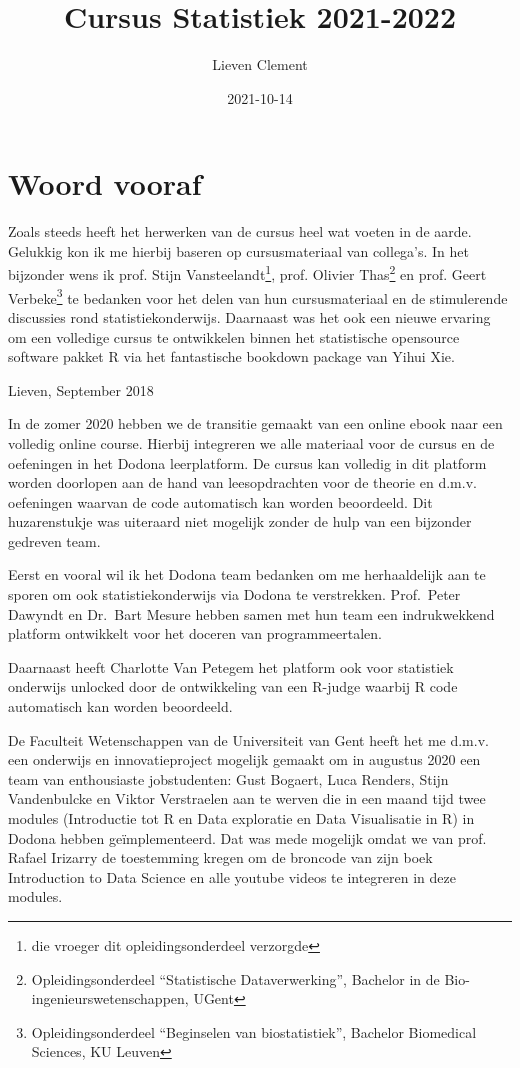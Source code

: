 \documentclass[
  12pt,dutch,coursenotes]{book}
\title{Cursus Statistiek 2021-2022}
\author{Lieven Clement}
\date{2021-10-14}
\theoremstyle{definition}
\theoremstyle{definition}
\theoremstyle{definition}
\theoremstyle{definition}
\theoremstyle{remark}
\begin{document}
\maketitle

{
\setcounter{tocdepth}{1}
\tableofcontents
}
\hypertarget{woord-vooraf}{%
\chapter*{Woord vooraf}\label{woord-vooraf}}

Zoals steeds heeft het herwerken van de cursus heel wat voeten in de aarde. Gelukkig kon ik me hierbij baseren op cursusmateriaal van collega's. In het bijzonder wens ik prof. Stijn Vansteelandt\footnote{die vroeger dit opleidingsonderdeel verzorgde}, prof. Olivier Thas\footnote{Opleidingsonderdeel ``Statistische Dataverwerking'', Bachelor in de Bio-ingenieurswetenschappen, UGent} en prof. Geert Verbeke\footnote{Opleidingsonderdeel ``Beginselen van biostatistiek'', Bachelor Biomedical Sciences, KU Leuven} te bedanken voor het delen van hun cursusmateriaal en de stimulerende discussies rond statistiekonderwijs. Daarnaast was het ook een nieuwe ervaring om een volledige cursus te ontwikkelen binnen het statistische opensource software pakket R via het fantastische bookdown package van Yihui Xie.

Lieven, September 2018

In de zomer 2020 hebben we de transitie gemaakt van een online ebook naar een volledig online course.
Hierbij integreren we alle materiaal voor de cursus en de oefeningen in het Dodona leerplatform.
De cursus kan volledig in dit platform worden doorlopen aan de hand van leesopdrachten voor de theorie en d.m.v. oefeningen waarvan de code automatisch kan worden beoordeeld.
Dit huzarenstukje was uiteraard niet mogelijk zonder de hulp van een bijzonder gedreven team.

Eerst en vooral wil ik het Dodona team bedanken om me herhaaldelijk aan te sporen om ook statistiekonderwijs via Dodona te verstrekken. Prof.~Peter Dawyndt en Dr.~Bart Mesure hebben samen met hun team een indrukwekkend platform ontwikkelt voor het doceren van programmeertalen.

Daarnaast heeft Charlotte Van Petegem het platform ook voor statistiek onderwijs unlocked door de ontwikkeling van een R-judge waarbij R code automatisch kan worden beoordeeld.

De Faculteit Wetenschappen van de Universiteit van Gent heeft het me d.m.v. een onderwijs en innovatieproject mogelijk gemaakt om in augustus 2020 een team van enthousiaste jobstudenten: Gust Bogaert, Luca Renders, Stijn Vandenbulcke en Viktor Verstraelen aan te werven die in een maand tijd twee modules (Introductie tot R en Data exploratie en Data Visualisatie in R) in Dodona hebben geïmplementeerd. Dat was mede mogelijk omdat we van prof. Rafael Irizarry de toestemming kregen om de broncode van zijn boek Introduction to Data Science en alle youtube videos te integreren in deze modules.
\end{document}
